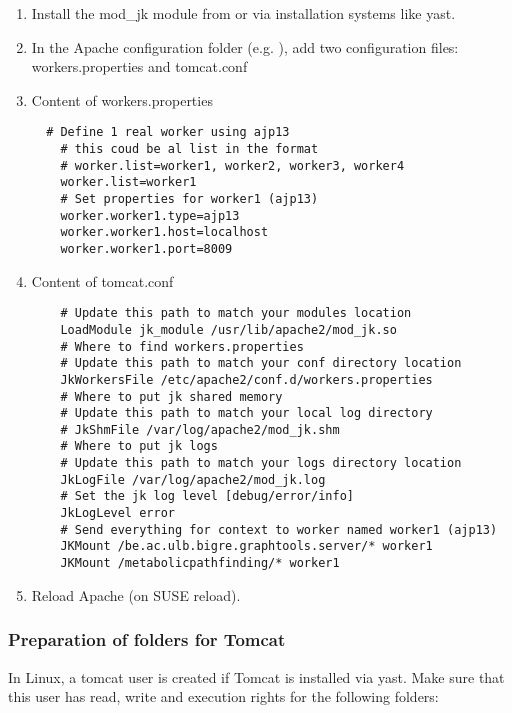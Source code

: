 \documentclass{book}
\begin{document}
\begin{enumerate}
\item Install the mod\_jk module from 
      or via installation systems like yast.
      \pagebreak
\item In the Apache configuration folder
(e.g. ), add two configuration files: workers.properties and tomcat.conf
\item Content of workers.properties
\begin{verbatim}
  # Define 1 real worker using ajp13
    # this coud be al list in the format
    # worker.list=worker1, worker2, worker3, worker4
    worker.list=worker1
    # Set properties for worker1 (ajp13)
    worker.worker1.type=ajp13
    worker.worker1.host=localhost
    worker.worker1.port=8009
\end{verbatim}
\item Content of tomcat.conf
\begin{verbatim}
    # Update this path to match your modules location
    LoadModule jk_module /usr/lib/apache2/mod_jk.so
    # Where to find workers.properties
    # Update this path to match your conf directory location
    JkWorkersFile /etc/apache2/conf.d/workers.properties
    # Where to put jk shared memory
    # Update this path to match your local log directory
    # JkShmFile /var/log/apache2/mod_jk.shm
    # Where to put jk logs
    # Update this path to match your logs directory location
    JkLogFile /var/log/apache2/mod_jk.log
    # Set the jk log level [debug/error/info]
    JkLogLevel error
    # Send everything for context to worker named worker1 (ajp13)
    JKMount /be.ac.ulb.bigre.graphtools.server/* worker1
    JKMount /metabolicpathfinding/* worker1
\end{verbatim}
\item Reload Apache (on SUSE  reload).
\end{enumerate}

\subsubsection{Preparation of folders for Tomcat}
In Linux, a tomcat user is created if Tomcat is installed via yast. Make sure
that this user has read, write and execution rights for the following folders:\\
\\
\\
\\
\\
\end{document}
